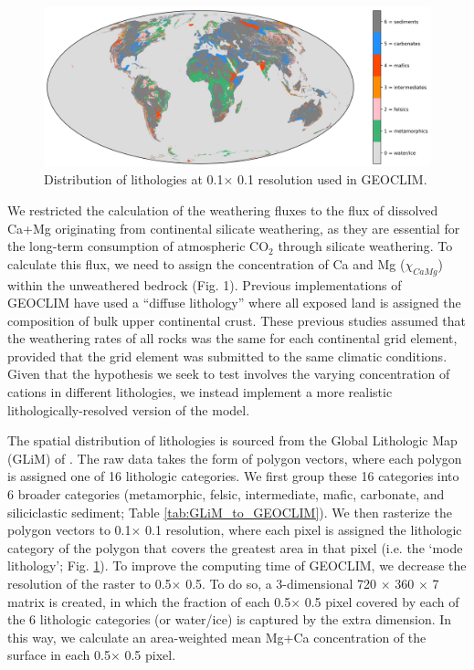 \documentclass[11pt,letterpaper]{article}
\newcommand{\degrees}{\textdegree\xspace}
\newcommand{\COtwo}{CO$_{2}$\xspace}
\begin{document}
\begin{figure}[h!]
    \centering
    \includegraphics[width=1\textwidth]{Figures/world_lithology.jpg}
    \caption{Distribution of lithologies at 0.1\degrees $\times$ 0.1\degrees resolution used in GEOCLIM.}
    \label{fig:world_lithology}
\end{figure}

We restricted the calculation of the weathering fluxes to the flux of dissolved Ca+Mg originating from continental silicate weathering, as they are essential for the long-term consumption of atmospheric \COtwo through silicate weathering. To calculate this flux, we need to assign the concentration of Ca and Mg ($\chi_{CaMg}$) within the unweathered bedrock (Fig. 1). Previous implementations of GEOCLIM have used a ``diffuse lithology'' where all exposed land is assigned the composition of bulk upper continental crust. These previous studies assumed that the weathering rates of all rocks was the same for each continental grid element, provided that the grid element was submitted to the same climatic conditions. Given that the hypothesis we seek to test involves the varying concentration of cations in different lithologies, we instead implement a more realistic lithologically-resolved version of the model.

The spatial distribution of lithologies is sourced from the Global Lithologic Map (GLiM) of \citet{Hartmann2012a}. The raw data takes the form of polygon vectors, where each polygon is assigned one of 16 lithologic categories. We first group these 16 categories into 6 broader categories (metamorphic, felsic, intermediate, mafic, carbonate, and siliciclastic sediment; Table \ref{tab:GLiM_to_GEOCLIM}). We then rasterize the polygon vectors to 0.1\degrees $\times$ 0.1\degrees resolution, where each pixel is assigned the lithologic category of the polygon that covers the greatest area in that pixel (i.e. the `mode lithology'; Fig. \ref{fig:world_lithology}). To improve the computing time of GEOCLIM, we decrease the resolution of the raster to 0.5\degrees $\times$ 0.5\degrees. To do so, a 3-dimensional 720 $\times$ 360 $\times$ 7 matrix is created, in which the fraction of each 0.5\degrees $\times$ 0.5\degrees pixel covered by each of the 6 lithologic categories (or water/ice) is captured by the extra dimension. In this way, we calculate an area-weighted mean Mg+Ca concentration of the surface in each 0.5\degrees $\times$ 0.5\degrees pixel.
\end{document}
